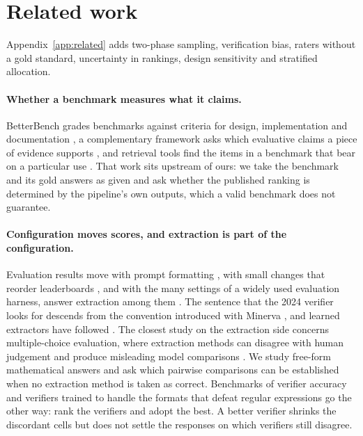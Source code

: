 \section{Related work}
\label{sec:related}

Appendix~\ref{app:related} adds two-phase sampling, verification bias, raters without a gold
standard, uncertainty in rankings, design sensitivity and stratified allocation.

\paragraph{Whether a benchmark measures what it claims.}
BetterBench grades benchmarks against criteria for design, implementation and documentation
\citep{reuel2024betterbench}, a complementary framework asks which evaluative claims a piece of
evidence supports \citep{salaudeen2025measurement}, and retrieval tools find the items in a
benchmark that bear on a particular use \citep{diddee2026benchbrowser}. That work sits upstream of
ours: we take the benchmark and its gold answers as given and ask whether the published ranking is
determined by the pipeline's own outputs, which a valid benchmark does not guarantee.

\paragraph{Configuration moves scores, and extraction is part of the configuration.}
Evaluation results move with prompt formatting \citep{sclar2023quantifying}, with small changes
that reorder leaderboards \citep{alzahrani2024benchmarks}, and with the many settings of a widely
used evaluation harness, answer extraction among them \citep{biderman2024lessons}. The sentence
that the 2024 verifier looks for descends from the convention introduced with
Minerva \citep{lewkowycz2022minerva}, and learned extractors have followed \citep{yu2024xfinder}.
The closest study on the extraction side concerns multiple-choice evaluation, where extraction
methods can disagree with human judgement and produce misleading model comparisons
\citep{molfese2025right}. We study free-form mathematical answers and ask which pairwise
comparisons can be established when no extraction method is taken as correct. Benchmarks of verifier accuracy \citep{li2025verifybench} and
verifiers trained to handle the formats that defeat regular expressions
\citep{liu2025compassverifier} go the other way: rank the verifiers and adopt the best. A better
verifier shrinks the discordant cells but does not settle the responses on which verifiers still
disagree.

